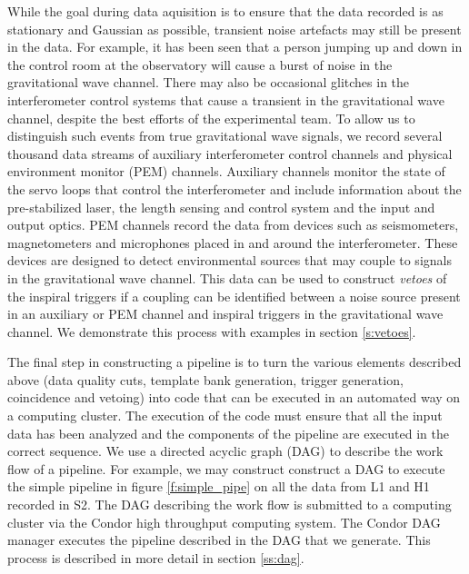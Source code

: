 While the goal during data aquisition is to ensure that the data recorded is
as stationary and Gaussian as possible, transient noise artefacts may still be
present in the data. For example, it has been seen that a person jumping up
and down in the control room at the observatory will cause a burst of noise in
the gravitational wave channel. There may also be occasional glitches in the
interferometer control systems that cause a transient in the gravitational
wave channel, despite the best efforts of the experimental team. To allow us
to distinguish such events from true gravitational wave signals, we record
several thousand data streams of auxiliary interferometer control channels and
physical environment monitor (PEM) channels. Auxiliary channels monitor the
state of the servo loops that control the interferometer and include
information about the pre-stabilized laser, the length sensing and control
system and the input and output optics.  PEM channels record the data from
devices such as seismometers, magnetometers and microphones placed in and
around the interferometer. These devices are designed to detect environmental
sources that may couple to signals in the gravitational wave channel. This
data can be used to construct \emph{vetoes} of the inspiral triggers if a
coupling can be identified between a noise source present in an auxiliary or
PEM channel and inspiral triggers in the gravitational wave channel.  We
demonstrate this process with examples in section \ref{s:vetoes}. 

The final step in constructing a pipeline is to turn the various elements
described above (data quality cuts, template bank generation, trigger
generation, coincidence and vetoing) into code that can be executed in an
automated way on a computing cluster. The execution of the code must ensure
that all the input data has been analyzed and the components of the pipeline
are executed in the correct sequence. We use a directed acyclic graph
(DAG) to describe the work flow of a pipeline.  For example, we may
construct construct a DAG to execute the simple pipeline in figure
\ref{f:simple_pipe} on all the data from L1 and H1 recorded in S2. The DAG
describing the work flow is submitted to a computing cluster via the Condor
high throughput computing system\cite{beowulfbook-condor}. The Condor DAG
manager executes the pipeline described in the DAG that we generate. This
process is described in more detail in section \ref{ss:dag}.


